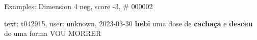 \begin{frame}{Examples: Dimension 4 neg, score -3, \# 000002}
\footnotesize
\begin{alertblock}{text: t042915, user: unknown, 2023-03-30}
\textbf{bebi} uma dose de \textbf{cachaça} e \textbf{desceu} de uma forma VOU 
MORRER 
\end{alertblock}
\end{frame}
